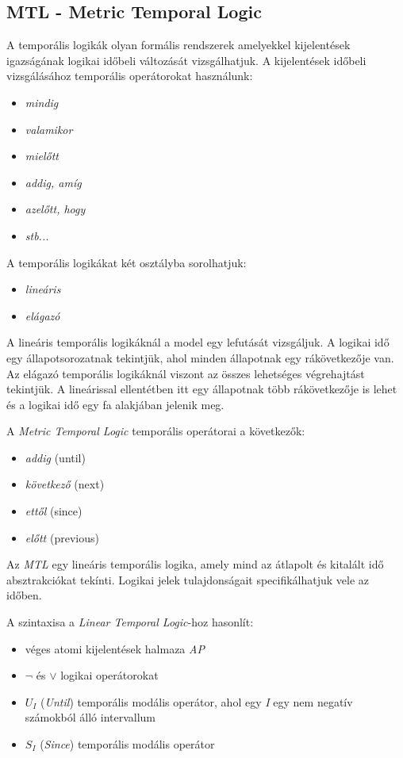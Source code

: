 \subsection{MTL - Metric Temporal Logic}

A temporális logikák olyan formális rendszerek amelyekkel kijelentések igazságának logikai időbeli változását vizsgálhatjuk.
A kijelentések időbeli vizsgálásához temporális operátorokat használunk:
\begin{itemize}
    \item \textit{mindig}
    \item \textit{valamikor}
    \item \textit{mielőtt}
    \item \textit{addig, amíg}
    \item \textit{azelőtt, hogy}
    \item \textit{stb...}
\end{itemize}
A temporális logikákat két osztályba sorolhatjuk:
\begin{itemize}
    \item \textit{lineáris}
    \item \textit{elágazó}
\end{itemize}
A lineáris temporális logikáknál a model egy lefutását vizsgáljuk.
A logikai idő egy állapotsorozatnak tekintjük, ahol minden állapotnak egy rákövetkezője van.
Az elágazó temporális logikáknál viszont az összes lehetséges végrehajtást tekintjük.
A lineárissal ellentétben itt egy állapotnak több rákövetkezője is lehet és a logikai idő egy fa alakjában jelenik meg.

A \textit{Metric Temporal Logic} temporális operátorai a következők:
\begin{itemize}
    \item \textit{addig} (until)
    \item \textit{következő} (next)
    \item \textit{ettől} (since)
    \item \textit{előtt} (previous)
\end{itemize}
Az \textit{MTL} egy lineáris temporális logika, amely mind az átlapolt és kitalált idő absztrakciókat tekínti.
Logikai jelek tulajdonságait specifikálhatjuk vele az időben.

A szintaxisa a \textit{Linear Temporal Logic}-hoz hasonlít:
\begin{itemize}
    \item véges atomi kijelentések halmaza \textit{AP}
    \item $\neg$ és $\lor$ logikai operátorokat
    \item $U_I$ (\textit{Until}) temporális modális operátor, ahol egy \textit{I} egy nem negatív számokból álló intervallum
    \item $S_I$ (\textit{Since}) temporális modális operátor
\end{itemize}

